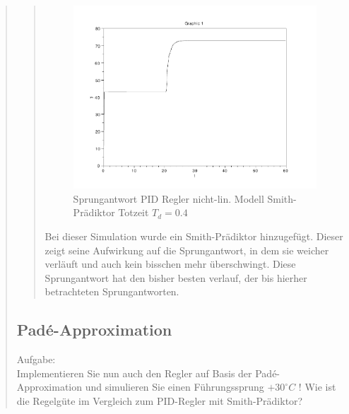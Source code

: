 \begin{quote}
    \begin{quote}
        \begin{figure}[H]
        \centering
            \includegraphics[scale=0.7, trim = 0cm 0cm 0cm 0cm, clip]{./Bilder/4_3_Td_04}
               \caption{Sprungantwort PID Regler nicht-lin. Modell Smith-Prädiktor Totzeit $T_d = 0.4$}
        \end{figure}
    
        Bei dieser Simulation wurde ein Smith-Prädiktor hinzugefügt. Dieser zeigt seine Aufwirkung auf die
        Sprungantwort, in dem sie weicher verläuft und auch kein bisschen mehr überschwingt. Diese Sprungantwort hat den
        bisher besten verlauf, der bis hierher betrachteten Sprungantworten.
    
    \end{quote}
    
    
    \subsection{Pad\'e-Approximation}
    Aufgabe:\\
    Implementieren Sie nun auch den Regler auf Basis der Pad\'e-Approximation und simulieren Sie einen Führungssprung
    $+30^{\circ} C$ ! Wie ist die Regelgüte im Vergleich zum PID-Regler mit Smith-Prädiktor?\vspace{1em}
    

\end{quote}
